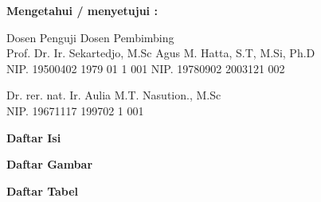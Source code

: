 \documentclass[12pt]{article}
\begin{document}
	\begin{center}
		\textbf{Mengetahui / menyetujui :}
	\end{center}

	
	\begin{center}
		Dosen Penguji \hspace{150pt} Dosen Pembimbing \\
		Prof. Dr. Ir. Sekartedjo, M.Sc \hspace{75pt} Agus M. Hatta, S.T, M.Si, Ph.D \\
		NIP. 19500402 1979 01 1 001 \hspace{85pt} NIP. 19780902 2003121 002 \\
	\end{center}

	\vspace{100pt}	
	
	\begin{flushleft}
		Dr. rer. nat. Ir. Aulia M.T. Nasution., M.Sc \\
		NIP. 19671117 199702 1 001
	\end{flushleft}

\newpage
\thispagestyle{plain}
\mbox{}

\newpage

	\begin{center}
		\textbf{{\large Daftar Isi}}
	\end{center}
	
	\tableofcontents

\newpage
\thispagestyle{plain}
\mbox{}

\newpage

	\begin{center}
		\textbf{{\large Daftar Gambar}}
	\end{center}

	\listoffigures

\newpage
\thispagestyle{plain}
\mbox{}

\newpage

	\begin{center}
		\textbf{{\large Daftar Tabel}}
	\end{center}
\end{document}
